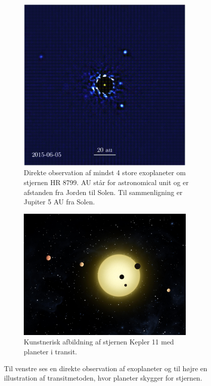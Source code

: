 \begin{figure}[h!]
    \centering
    \begin{subfigure}{.45\textwidth}
        \centering
        \includegraphics[width = 0.95\textwidth]{Astrofysik/billeder/Direct_imaging_image.PNG} 
        \caption{Direkte observation af mindst 4 store exoplaneter om stjernen HR 8799. AU står for astronomical unit og er afstanden fra Jorden til Solen. Til sammenligning er Jupiter 5 AU fra Solen.}
        \label{DI}
    \end{subfigure}
    \hspace{5mm}
    \begin{subfigure}{.45\textwidth}
        \centering
        \vspace{2mm}
        \includegraphics[width = 0.95\textwidth]{Astrofysik/billeder/Kepler11.png}
        \vspace{6mm}
        \caption{Kunstnerisk afbildning af stjernen Kepler 11 med planeter i transit.}
        \label{Kepler11}
    \end{subfigure}
    \caption{Til venstre ses en direkte observation af exoplaneter og til højre en illustration af transitmetoden, hvor planeter skygger for stjernen.}
\end{figure}

